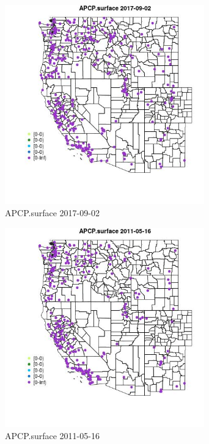\begin{figure} 
\centering  
\includegraphics[width=0.77\textwidth]{Code_Outputs/Report_ML_input_PM25_Step4_part_e_de_duplicated_aves_compiled_2019-05-21wNAs_MapObsAPCPsurface2017-09-02.jpg} 
\caption{\label{fig:Report_ML_input_PM25_Step4_part_e_de_duplicated_aves_compiled_2019-05-21wNAsMapObsAPCPsurface2017-09-02}APCP.surface 2017-09-02} 
\end{figure} 
 

\begin{figure} 
\centering  
\includegraphics[width=0.77\textwidth]{Code_Outputs/Report_ML_input_PM25_Step4_part_e_de_duplicated_aves_compiled_2019-05-21wNAs_MapObsAPCPsurface2011-05-16.jpg} 
\caption{\label{fig:Report_ML_input_PM25_Step4_part_e_de_duplicated_aves_compiled_2019-05-21wNAsMapObsAPCPsurface2011-05-16}APCP.surface 2011-05-16} 
\end{figure} 
 

